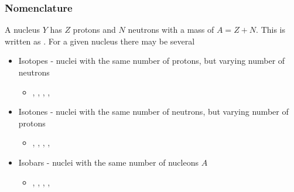 \subsubsection{Nomenclature}
A nucleus $Y$ has $Z$ protons and $N$ neutrons with a mass of $A = Z + N$.
This is written as . For a given nucleus there may be several
\begin{itemize}
	\item Isotopes - nuclei with the same number of protons, but varying number of neutrons
	\begin{itemize}
		\item {}, , , , 
	\end{itemize}
	\item Isotones - nuclei with the same number of neutrons, but varying number of protons
	\begin{itemize}
		\item {}, , , , 
	\end{itemize}
	\item Isobars - nuclei with the same number of nucleons $A$
	\begin{itemize}
		\item {}, , , , 
	\end{itemize}
\end{itemize}